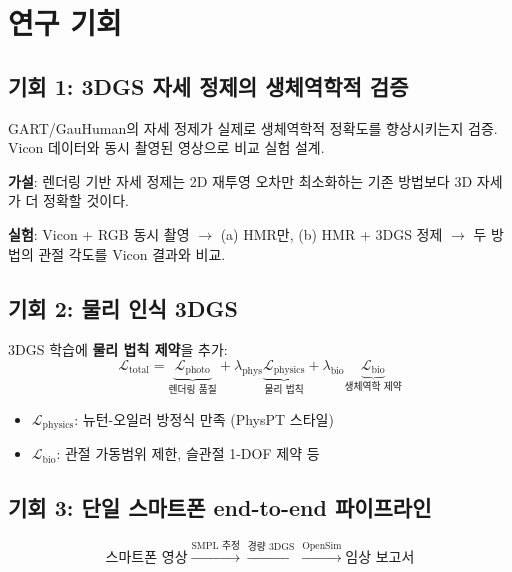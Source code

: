 \documentclass[11pt, a4paper]{report}
\begin{document}
\section{연구 기회}

\subsection{기회 1: 3DGS 자세 정제의 생체역학적 검증}

\begin{keyidea}
GART/GauHuman의 자세 정제가 실제로 생체역학적 정확도를 향상시키는지 검증. Vicon 데이터와 동시 촬영된 영상으로 비교 실험 설계.
\end{keyidea}

\textbf{가설}: 렌더링 기반 자세 정제는 2D 재투영 오차만 최소화하는 기존 방법보다 3D 자세가 더 정확할 것이다.

\textbf{실험}: Vicon + RGB 동시 촬영 $\rightarrow$ (a) HMR만, (b) HMR + 3DGS 정제 $\rightarrow$ 두 방법의 관절 각도를 Vicon 결과와 비교.

\subsection{기회 2: 물리 인식 3DGS}

3DGS 학습에 \textbf{물리 법칙 제약}을 추가:
\begin{equation}
\mathcal{L}_{\text{total}} = \underbrace{\mathcal{L}_{\text{photo}}}_{\text{렌더링 품질}} + \lambda_{\text{phys}} \underbrace{\mathcal{L}_{\text{physics}}}_{\text{물리 법칙}} + \lambda_{\text{bio}} \underbrace{\mathcal{L}_{\text{bio}}}_{\text{생체역학 제약}}
\end{equation}

\begin{itemize}[leftmargin=*]
  \item $\mathcal{L}_{\text{physics}}$: 뉴턴-오일러 방정식 만족 (PhysPT 스타일)
  \item $\mathcal{L}_{\text{bio}}$: 관절 가동범위 제한, 슬관절 1-DOF 제약 등
\end{itemize}

\subsection{기회 3: 단일 스마트폰 end-to-end 파이프라인}

\begin{equation}
\text{스마트폰 영상} \xrightarrow{\text{SMPL 추정}} \xrightarrow{\text{경량 3DGS}} \xrightarrow{\text{OpenSim}} \text{임상 보고서}
\end{equation}
\end{document}
